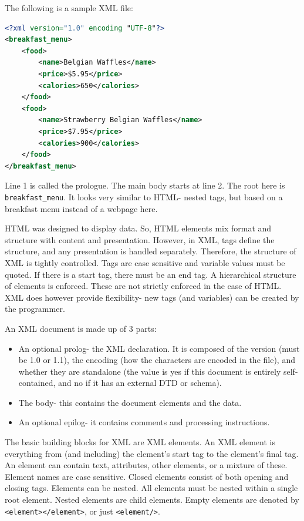\documentclass[a4paper, openany]{memoir}
\begin{document}
\noindent The following is a sample XML file:
\begin{lstlisting}[language=xml]
<?xml version="1.0" encoding "UTF-8"?>
<breakfast_menu>
    <food>
        <name>Belgian Waffles</name>
        <price>$5.95</price>
        <calories>650</calories>
    </food>
    <food>
        <name>Strawberry Belgian Waffles</name>
        <price>$7.95</price>
        <calories>900</calories>
    </food>
</breakfast_menu>
\end{lstlisting}
Line 1 is called the prologue. The main body starts at line 2. The root here is \texttt{breakfast\_menu}. It looks very similar to HTML- nested tags, but based on a breakfast menu instead of a webpage here.

\noindent HTML was designed to display data. So, HTML elements mix format and structure with content and presentation. However, in XML, tags define the structure, and any presentation is handled separately. Therefore, the structure of XML is tightly controlled. Tags are case sensitive and variable values must be quoted. If there is a start tag, there must be an end tag. A hierarchical structure of elements is enforced. These are not strictly enforced in the case of HTML. XML does however provide flexibility- new tags (and variables) can be created by the programmer.

\noindent An XML document is made up of 3 parts:
\begin{itemize}
    \item An optional prolog- the XML declaration. It is composed of the version (must be 1.0 or 1.1), the encoding (how the characters are encoded in the file), and whether they are standalone (the value is yes if this document is entirely self-contained, and no if it has an external DTD or schema).
    \item The body- this contains the document elements and the data.
    \item An optional epilog- it contains comments and processing instructions.
\end{itemize}
The basic building blocks for XML are XML elements. An XML element is everything from (and including) the element's start tag to the element's final tag. An element can contain text, attributes, other elements, or a mixture of these. Element names are case sensitive. Closed elements consist of both opening and closing tags. Elements can be nested. All elements must be nested within a single root element. Nested elements are child elements. Empty elements are denoted by \texttt{<element></element>}, or just \texttt{<element/>}.
\end{document}
